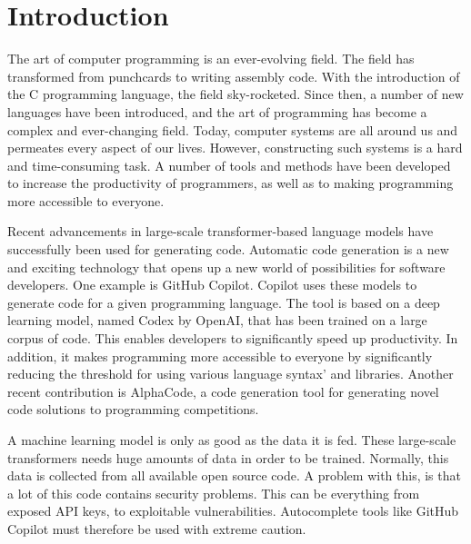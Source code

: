 \chapter{Introduction}

\begin{comment}
*Some sentences (two to three) of 
    Research background 
    Research motivation 
    Summarize the state of the art and state of the practice 
    To argue that your study is the world most interesting topic
    Research questions
    Research methods 
    Research results and main contributions
*Structure of the thesis
\end{comment}


The art of computer programming is an ever-evolving field. The field has transformed from punchcards to writing assembly code. With the introduction of the C programming language, the field sky-rocketed. Since then, a number of new languages have been introduced, and the art of programming has become a complex and ever-changing field. Today, computer systems are all around us and permeates every aspect of our lives. However, constructing such systems is a hard and time-consuming task. A number of tools and methods have been developed to increase the productivity of programmers, as well as to making programming more accessible to everyone. 

Recent advancements in large-scale transformer-based language models have successfully been used for generating code. Automatic code generation is a new and exciting technology that opens up a new world of possibilities for software developers. One example is GitHub Copilot. Copilot uses these models to generate code for a given programming language. The tool is based on a deep learning model, named Codex by OpenAI, that has been trained on a large corpus of code. This enables developers to significantly speed up productivity. In addition, it makes programming more accessible to everyone by significantly reducing the threshold for using various language syntax' and libraries. Another recent contribution is AlphaCode, a code generation tool for generating novel code solutions to programming competitions.

A machine learning model is only as good as the data it is fed. These large-scale transformers needs huge amounts of data in  order to be trained. Normally, this data is collected from all available open source code. A problem with this, is that a lot of this code contains security problems. This can be everything from exposed API keys, to exploitable vulnerabilities. Autocomplete tools like GitHub Copilot must therefore be used with extreme caution.


